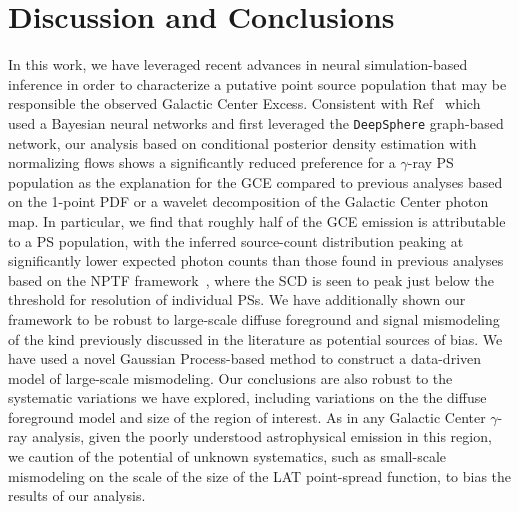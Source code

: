 \documentclass[prd,aps,10pt,nofootinbib,twocolumn,superscriptaddress,preprintnumbers,balancelastpage,longbibliography]{revtex4-1}
\begin{document}
\section{Discussion and Conclusions}
\label{sec:conclusion}

In this work, we have leveraged recent advances in neural simulation-based inference in order to characterize a putative point source population that may be responsible the observed \Fermi Galactic Center Excess. Consistent with Ref~\cite{List:2020mzd} which used a Bayesian neural networks and first leveraged the \texttt{DeepSphere} graph-based network, our analysis based on conditional posterior density estimation with normalizing flows shows a significantly reduced preference for a $\gamma$-ray PS population as the explanation for the GCE compared to previous analyses based on the 1-point PDF or a wavelet decomposition of the Galactic Center photon map. In particular, we find that roughly half of the GCE emission is attributable to a PS population, with the inferred source-count distribution peaking at significantly lower expected photon counts than those found in previous analyses based on the NPTF framework~\cite{Lee:2015fea}, where the SCD is seen to peak just below the threshold for resolution of individual PSs. We have additionally shown our framework to be robust to large-scale diffuse foreground and signal mismodeling of the kind previously discussed in the literature as potential sources of bias. We have used a novel Gaussian Process-based method to construct a data-driven model of large-scale mismodeling. Our conclusions are also robust to the systematic variations we have explored, including variations on the the diffuse foreground model and size of the region of interest. As in any Galactic Center $\gamma$-ray analysis, given the poorly understood astrophysical emission in this region, we caution of the potential of unknown systematics, such as small-scale mismodeling on the scale of the size of the LAT point-spread function, to bias the results of our analysis.
\end{document}
